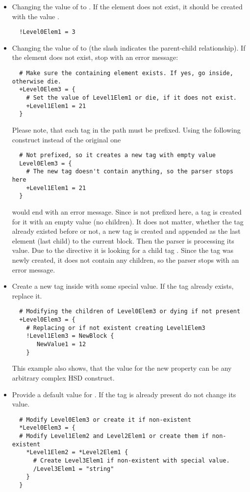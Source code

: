 \begin{itemize}
\item Changing the value of  to . If the element does not
  exist, it should be created with the value .
\begin{verbatim}
  !Level0Elem1 = 3
\end{verbatim}

\item Changing the value of  to  (the slash
  indicates the parent-child relationship). If the element does not exist, stop
  with an error message:
\begin{verbatim}
  # Make sure the containing element exists. If yes, go inside, otherwise die.
  +Level0Elem3 = {
    # Set the value of Level1Elem1 or die, if it does not exist.
    +Level1Elem1 = 21
  }
\end{verbatim}
  Please note, that each tag in the path must be prefixed. Using the following
  construct instead of the original one
\begin{verbatim}
  # Not prefixed, so it creates a new tag with empty value
  Level0Elem3 = {
    # The new tag doesn't contain anything, so the parser stops here
    +Level1Elem1 = 21
  }
\end{verbatim}
  would end with an error message. Since  is not prefixed here,
  a tag is created for it with an empty value (no children). It does not matter,
  whether the tag already existed before or not, a new tag is created and
  appended as the last element (last child) to the current block. Then the
  parser is processing its value. Due to the  directive it is
  looking for a child tag . Since the tag was newly created,
  it does not contain any children, so the parser stops with an error message.

\item Create a new tag  inside  with some
  special value. If the tag already exists, replace it.
\begin{verbatim}
  # Modifying the children of Level0Elem3 or dying if not present
  +Level0Elem3 = {
    # Replacing or if not existent creating Level1Elem3
    !Level1Elem3 = NewBlock {
       NewValue1 = 12
    }
\end{verbatim}
  This example also shows, that the value for the new property can be any
  arbitrary complex HSD construct.

\item Provide a default value  for
  . If the tag is already
  present do not change its value.
\begin{verbatim}
  # Modify Level0Elem3 or create it if non-existent
  *Level0Elem3 = {
  # Modify Level1Elem2 and Level2Elem1 or create them if non-existent
    *Level1Elem2 = *Level2Elem1 {
      # Create Level3Elem1 if non-existent with special value.
      /Level3Elem1 = "string"
    }
  }
\end{verbatim}


\end{itemize}
